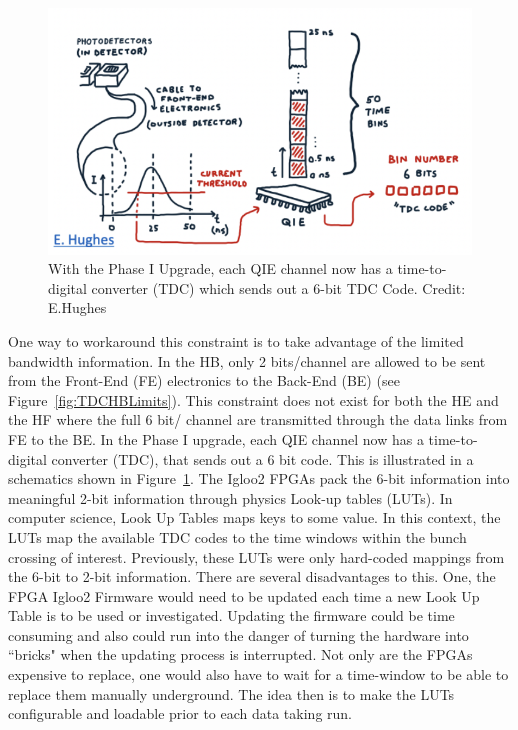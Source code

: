 \begin{figure}[htbp!]
\caption{With the Phase I Upgrade, each QIE channel now has a time-to-digital converter (TDC) which sends out a 6-bit TDC Code. Credit: E.Hughes}
\begin{center}
\includegraphics[scale=1.2]{fig/TDCCode.png}
\end{center}
\label{fig:L1TriggerSketch}
\end{figure}

One way to workaround this constraint is to take advantage of the limited bandwidth information. In the HB, only 2 bits/channel are allowed to be sent from the Front-End (FE) electronics to the Back-End (BE) (see Figure~\ref{fig:TDCHBLimits}). This constraint does not exist for both the HE and the HF where the full 6 bit/ channel are transmitted through the data links from FE to the BE. In the Phase I upgrade, each QIE channel now has a time-to-digital converter (TDC), that sends out a 6 bit code.  This is illustrated in a schematics shown in Figure~\ref{fig:L1TriggerSketch}. The Igloo2 FPGAs pack the 6-bit information into meaningful 2-bit information through physics Look-up tables (LUTs). In computer science, Look Up Tables maps keys to some value. In this context, the LUTs map the available TDC codes to the time windows within the bunch crossing of interest. Previously, these LUTs were only hard-coded mappings from the 6-bit to 2-bit information. There are several disadvantages to this. One, the FPGA Igloo2 Firmware would need to be updated each time a new Look Up Table is to be used or investigated. Updating the firmware could be time consuming and also could run into the danger of turning the hardware into ``bricks" when the updating process is interrupted. Not only are the FPGAs expensive to replace, one would also have to wait for a time-window to be able to replace them manually underground. The idea then is to make the LUTs configurable and loadable prior to each data taking run. 

